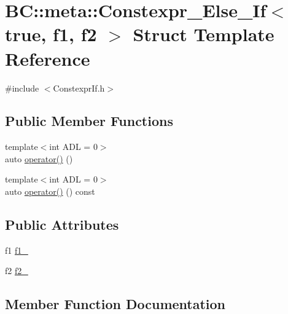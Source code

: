 \hypertarget{structBC_1_1meta_1_1Constexpr__Else__If_3_01true_00_01f1_00_01f2_01_4}{}\section{BC\+:\+:meta\+:\+:Constexpr\+\_\+\+Else\+\_\+\+If$<$ true, f1, f2 $>$ Struct Template Reference}
\label{structBC_1_1meta_1_1Constexpr__Else__If_3_01true_00_01f1_00_01f2_01_4}


{\ttfamily \#include $<$Constexpr\+If.\+h$>$}

\subsection*{Public Member Functions}
\begin{DoxyCompactItemize}
\item 
{\footnotesize template$<$int A\+DL = 0$>$ }\\auto \hyperlink{structBC_1_1meta_1_1Constexpr__Else__If_3_01true_00_01f1_00_01f2_01_4_a4b6c237673465409450a79790d09c01a}{operator()} ()
\item 
{\footnotesize template$<$int A\+DL = 0$>$ }\\auto \hyperlink{structBC_1_1meta_1_1Constexpr__Else__If_3_01true_00_01f1_00_01f2_01_4_a1e38f1eebadc399a2a8a8b00a722682e}{operator()} () const 
\end{DoxyCompactItemize}
\subsection*{Public Attributes}
\begin{DoxyCompactItemize}
\item 
f1 \hyperlink{structBC_1_1meta_1_1Constexpr__Else__If_3_01true_00_01f1_00_01f2_01_4_a8cadb6539c24f01a5b05b0df987ac3f5}{f1\+\_\+}
\item 
f2 \hyperlink{structBC_1_1meta_1_1Constexpr__Else__If_3_01true_00_01f1_00_01f2_01_4_a0e4ada77a47b07b2b825749b4b1bd6cd}{f2\+\_\+}
\end{DoxyCompactItemize}


\subsection{Member Function Documentation}
